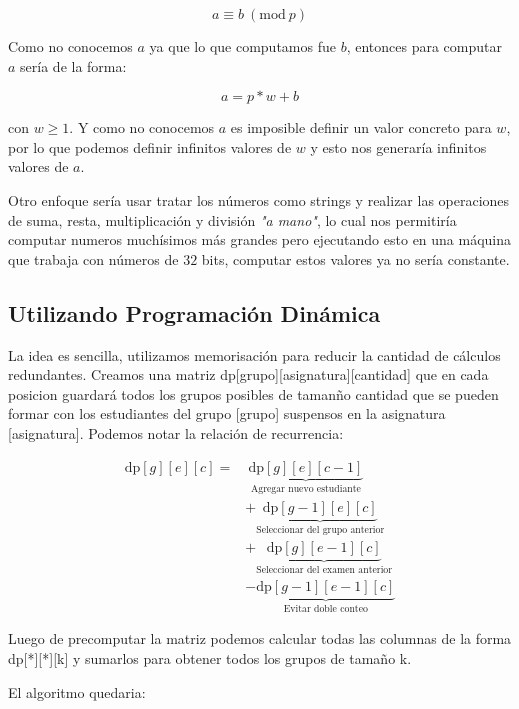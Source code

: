 \documentclass{article}
\begin{document}
$$ a \equiv b\ (\textrm{mod}\ p) $$

Como no conocemos $a$ ya que lo que computamos fue $b$, entonces para computar $a$ sería de la forma:

$$ a = p * w + b $$

con $w \geq 1$. Y como no conocemos $a$ es imposible definir un valor concreto para $w$, por lo que podemos definir infinitos valores de $w$ y esto nos generaría infinitos valores de $a$.

Otro enfoque sería usar tratar los números como strings y realizar las operaciones de suma, resta, multiplicación y división \textit{"a mano"}, lo cual nos permitiría computar numeros muchísimos más grandes pero ejecutando esto en una máquina que trabaja con números de $32$ bits, computar estos valores ya no sería constante. 

\subsection{Utilizando Programación Dinámica}

La idea es sencilla, utilizamos memorisación para reducir la cantidad de cálculos redundantes. Creamos una matriz dp[grupo][asignatura][cantidad] que en cada posicion guardará todos los grupos posibles de tamanño cantidad que se pueden formar con los estudiantes del grupo [grupo] suspensos en la asignatura [asignatura]. Podemos notar la relación de recurrencia:






\begin{equation}
\begin{split}
\text{dp}[g][e][c] = &\ \underbrace{\text{dp}[g][e][c-1]}_{\text{Agregar nuevo estudiante}} \\
&+ \underbrace{\text{dp}[g-1][e][c]}_{\text{Seleccionar del grupo anterior}} \\
&+ \underbrace{\text{dp}[g][e-1][c]}_{\text{Seleccionar del examen anterior}} \\
&- \underbrace{\text{dp}[g-1][e-1][c]}_{\text{Evitar doble conteo}}
\end{split}
\end{equation}

Luego de precomputar la matriz podemos calcular todas las columnas de la forma dp[*][*][k] y sumarlos para obtener todos los grupos de tamaño k. 

El algoritmo quedaria:
\end{document}
